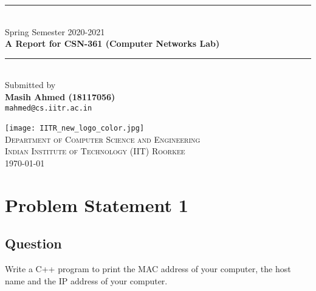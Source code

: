 \documentclass[11pt,a4paper]{article}
\newcommand{\HRule}{\rule{\linewidth}{0.5mm}}
\begin{document}
\begin{titlepage}
\begin{center}


\HRule \\[0.4cm]
{ 
Spring Semester 2020-2021\\[0.2cm]
\large{\bf A Report for CSN-361 (Computer Networks Lab)}\\[0.4cm]
}
\HRule \\[1.5cm]

Submitted by\\[0.5cm]
{
{\bf Masih Ahmed (18117056)}\\[0.1cm]
\texttt{mahmed@cs.iitr.ac.in}\\[0.1cm]
}

\vfill

\texttt{[image: IITR\_new\_logo\_color.jpg]}~\\[0.5cm]
\textsc{\large Department of Computer Science and Engineering}\\[0.2cm]
\textsc{\large Indian Institute of Technology (IIT) Roorkee}\\[0.2cm]

{\large \today}
 
\end{center}
\end{titlepage}


\newpage

\tableofcontents
{}
\newpage
\setcounter{page}{1}

\section{Problem Statement 1}\label{sec:problem1}
\subsection{Question}\label{sec:question1}
Write a C++ program to print the MAC address of your computer, the host name and the IP address of your
computer.
\end{document}
